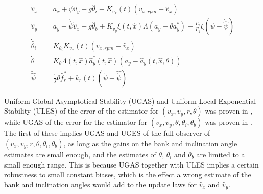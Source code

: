 \begin{align}
    \dot{\hat{v}}_x & = a_x + \dot{\psi}\hat{v}_y + g\hat{\theta}_i + K_{v_x}(t)(v_{x,rpm} - \hat{v}_x) \\
    \dot{\hat{v}}_y & = a_y - \dot{\hat{\psi}}\hat{v}_x - g\hat{\theta}_b + K_{v_y}\xi(t,\hat{x})\Lambda(a_y - \theta a_y^{*}) + \frac{\Gamma_2}{\Gamma_1}\zeta(\dot{\psi} - \dot{\hat{\psi}}) \\ 
    \dot{\hat{\theta}}_i & = K_{\theta_i}K_{v_x}(t)(v_{x,rpm} - \hat{v}_x) \\
    \dot{\theta} & = K_{\theta}\Lambda (t, \hat{x})\hat{a}_y^*(t,\hat{x})(a_y - \hat{a}_y(t,\hat{x},\theta)) \\ 
    \ddot{\hat{\psi}} & = \frac{1}{J}\theta \hat{f}_r^* + k_r(t)(\dot{\psi}-\hat{\dot{\psi}})
\end{align}

Uniform Global Asymptotical Stability (UGAS) and Uniform Local Exponential Stability (ULES) of the error of the estimator for $(v_x,v_y,r,\theta)$ was proven in \cite{Automatica08}, while UGAS of the error for the estimator for $(v_x,v_y,\theta, \theta_i, \theta_b)$ was proven in \cite{MainStateEst}. The first of these implies UGAS and UGES of the full observer of $(v_x,v_y, r,\theta, \theta_i, \theta_b)$, as long as the gains on the bank and inclination angle estimates are small enough, and the estimates of $\theta$, $\theta_i$ and $\theta_b$ are limited to a small enough range. This is because UGAS together with ULES implies a certain robustness to small constant biases, which is the effect a wrong estimate of the bank and inclination angles would add to the update laws for $\hat{v}_x$ and $\hat{v}_y$. 
